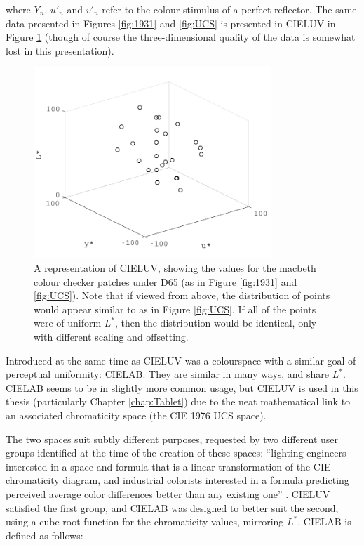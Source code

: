 where $Y_{n}$, $u'_{n}$ and $v'_{n}$ refer to the colour stimulus of a perfect reflector. The same data presented in Figures \ref{fig:1931} and \ref{fig:UCS} is presented in CIELUV in Figure \ref{fig:CIELUV} (though of course the three-dimensional quality of the data is somewhat lost in this presentation). 

\begin{figure}[hbtp]
\includegraphics[max width=0.8\textwidth]{figs/LitRev/ColorimetryDemo4.pdf}
\caption{A representation of CIELUV, showing the values for the macbeth colour checker patches under D65 (as in Figure \ref{fig:1931} and \ref{fig:UCS}). Note that if viewed from above, the distribution of points would appear similar to as in Figure \ref{fig:UCS}. If all of the points were of uniform $L^{*}$, then the distribution would be identical, only with different scaling and offsetting.}
\label{fig:CIELUV}
\end{figure}

Introduced at the same time as CIELUV was a colourspace with a similar goal of perceptual uniformity: CIELAB. They are similar in many ways, and share $L^{*}$. CIELAB seems to be in slightly more common usage, but CIELUV is used in this thesis (particularly Chapter \ref{chap:Tablet}) due to the neat mathematical link to an associated chromaticity space (the CIE 1976 UCS space). 

The two spaces suit subtly different purposes, requested by two different user groups identified at the time of the creation of these spaces: ``lighting engineers interested in a space and formula that is a linear transformation of the CIE chromaticity diagram, and industrial colorists interested in a formula predicting perceived average color differences better than any existing one'' \citep{kuehni_color_2008}. CIELUV satisfied the first group, and CIELAB was designed to better suit the second, using a cube root function for the chromaticity values, mirroring $L^{*}$. CIELAB is defined as follows:


